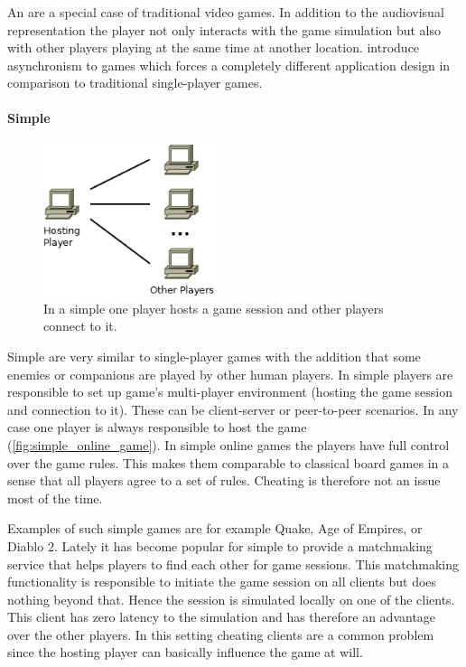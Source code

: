 \subsubsection{\ogs{}}
An \og{} are a special case of traditional video games. In addition to the
audiovisual representation the player not only interacts with the game
simulation but also with other players playing at the same time at another
location. \og{} introduce asynchronism to games which forces a completely
different application design in comparison to traditional single-player games.

\paragraph{Simple \ogs{}}

\begin{figure}
	\centering
	\includegraphics[width=5cm]{images/SimpleOnlineGame}
	\caption{In a simple \og{} one player hosts a game session and other players
	connect to it.}
	\label{fig:simple_online_game}
\end{figure}

Simple \ogs{} are very similar to single-player games with the addition that
some enemies or companions are played by other human players. In simple \ogs{}
players are responsible to set up game's multi-player environment (hosting the
game session and connection to it). These can be client-server or peer-to-peer
scenarios. In any case one player is always responsible to host the game
(\autoref{fig:simple_online_game}). In simple online games the players have full
control over the game rules. This makes them comparable to classical board games
in a sense that all players agree to a set of rules. Cheating is therefore not
an issue most of the time.

Examples of such simple games are for example Quake, Age of Empires, or Diablo
2. Lately it has become popular for simple \ogs{} to provide a matchmaking
service that helps players to find each other for game sessions. This
matchmaking functionality is responsible to initiate the game session on all
clients but does nothing beyond that. Hence the session is simulated locally on
one of the clients. This client has zero latency to the simulation and has
therefore an advantage over the other players. In this setting cheating clients
are a common problem since the hosting player can basically influence the game
at will.


